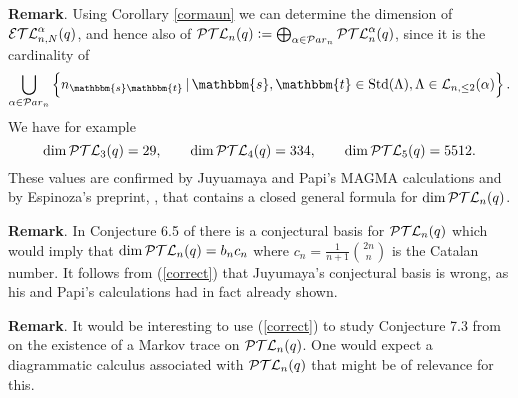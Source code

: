 \documentclass[10pt,a4,twoside,hidelinks,rm]{article}
\newcommand{\Par}{{\mathcal Par}_n}
\newcommand\es{\mathbbm{s}}
\newcommand\et{\mathbbm{t}}
\newcommand{\std}{{\rm Std}}
\newcommand{\PTLthree}{{\cal PTL}_3(q)}
\newcommand{\PTLfour}{{\cal PTL}_4(q)}
\newcommand{\PTLfive}{{\cal PTL}_5(q)}
\newcommand{\PTL}{{\cal PTL}_n(q)}
\newcommand{\PTLa}{{\cal PTL}^{\alpha}_n(q)}
\newcommand{\EaTL}{ {\cal ETL}_{n,N}^{  \alpha}(q)}
\theoremstyle{plain}
\begin{document}
\medskip
\noindent
    {\bf Remark}. Using Corollary \ref{cormaun} we can determine the
    dimension of $ \EaTL $, and hence also of $ \PTL:= \bigoplus_{\alpha \in \Par} \PTLa$,
    since it is the cardinality of
    \begin{equation}\label{correct} \bigcup_{\alpha \in \Par} \left\{ n_{\es\et} \, | \, \es, \et \in \std(\Lambda),
        \Lambda \in  {\cal L}_{n, \le 2}(\alpha)  \right\}.
    \end{equation}
        We have for example
        \begin{equation}
\dim \PTLthree =29 , \, \, \,\, \, \,\, \, \,\, \, \, 
          \dim \PTLfour =334 , \, \, \,\, \, \,\, \, \,\, \, \,    \dim \PTLfive =    5512.  \end{equation}
        These values are confirmed by Juyuamaya and Papi's MAGMA calculations and
        by Espinoza's preprint, \cite{Esp}, that contains a closed general formula for $ \dim \PTL$.
    
\medskip
\noindent
    {\bf Remark}. In Conjecture 6.5 of \cite{Juyumaya} there is a conjectural basis for $  \PTL$
    which would imply that $ \dim  \PTL = b_n c_n$ where $ c_n = \frac{1}{n+1} {2n \choose n}$
    is the Catalan number. It follows from (\ref{correct}) that Juyumaya's conjectural basis is wrong, as his and
    Papi's calculations had in fact already shown.  

\medskip
\noindent
    {\bf Remark}.
It would be interesting to use (\ref{correct}) to
    study Conjecture 7.3 from \cite{Juyumaya} on the existence of a Markov trace on $ \PTL $.
    One would expect a diagrammatic calculus associated with $\PTL$ that might be of relevance for this. 
    
\end{document}
